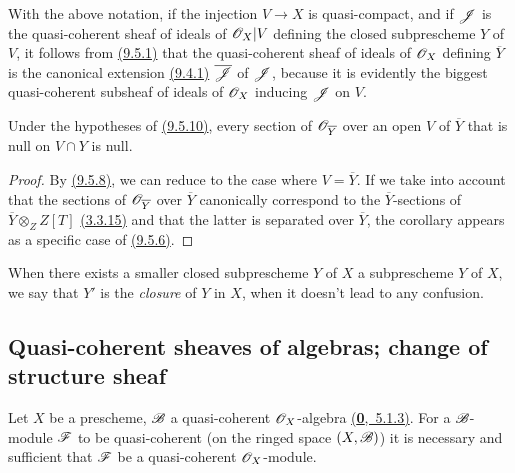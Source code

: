 With the above notation, if the injection $V\to X$ is quasi-compact, and if $\mathscr{J}$ is the quasi-coherent sheaf of ideals of $\mathscr{O}_X|V$ defining the closed subprescheme $Y$ of $V$, it follows from \hyperref[prop-1.9.5.1]{(9.5.1)} that the quasi-coherent sheaf of ideals of $\mathscr{O}_X$ defining $\overline{Y}$ is the canonical extension \hyperref[env-1.9.4.1]{(9.4.1)} $\overline{\mathscr{J}}$ of $\mathscr{J}$, because it is evidently the biggest quasi-coherent subsheaf of ideals of $\mathscr{O}_X$ inducing $\mathscr{J}$ on $V$.

\begin{cor}[9.5.11]
\label{cor-1.9.5.11}
Under the hypotheses of \hyperref[prop-1.9.5.10]{(9.5.10)}, every section of $\mathscr{O}_{\overline{Y}}$ over an open $V$ of $\overline{Y}$ that is null on $V\cap Y$ is null.
\end{cor}

\begin{proof}
\label{proof-cor-1.9.5.11}
By \hyperref[prop-1.9.5.8]{(9.5.8)}, we can reduce to the case where $V=\overline{Y}$.
If we take into account that the sections of $\mathscr{O}_{\overline{Y}}$ over $\overline{Y}$ canonically correspond to the $\overline{Y}$-sections of $\overline{Y}\otimes_Z Z[T]$ \hyperref[env-1.3.3.15]{(3.3.15)} and that the latter is separated over $\overline{Y}$, the corollary appears as a specific case of \hyperref[cor-1.9.5.6]{(9.5.6)}.
\end{proof}

When there exists a smaller closed subprescheme $Y$ of $X$  a subprescheme $Y$ of $X$, we say that $Y'$ is the {\it closure} of $Y$ in $X$, when it doesn't lead to any confusion.

\subsection{Quasi-coherent sheaves of algebras; change of structure sheaf}
\label{subsection-qcoh-algs-and-change-of-str-sheaf}

\begin{prop}[9.6.1]
\label{prop-1.9.6.1}
Let $X$ be a prescheme, $\mathscr{B}$ a quasi-coherent $\mathscr{O}_X$-algebra \hyperref[env-0.5.1.3]{(\textbf{0},~5.1.3)}.
For a $\mathscr{B}$-module $\mathscr{F}$ to be quasi-coherent (on the ringed space $(X,\mathscr{B})$) it is necessary and sufficient that $\mathscr{F}$ be a quasi-coherent $\mathscr{O}_X$-module.
\end{prop}

